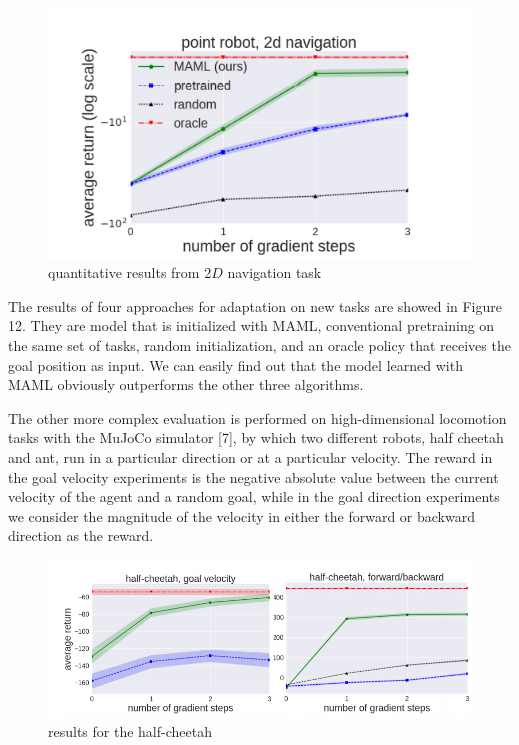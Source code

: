 \begin{figure}[H]
	\includegraphics[scale=0.8]{MAML_04.PNG}
	\centering
	\caption{ quantitative results from 2$D$ navigation task}
	\label{MAML}
\end{figure}

The results of four approaches for adaptation on new tasks are showed in Figure 12. They are model that is initialized with MAML, conventional pretraining on the same set of tasks, random initialization, and an oracle policy that receives the goal position as input. We can easily find out that the model learned with MAML obviously outperforms the other three algorithms.

The other more complex evaluation is performed on high-dimensional locomotion tasks with the MuJoCo simulator [7], by which two different robots, half  cheetah and ant, run in a particular direction or at a particular velocity. The reward in the goal velocity experiments is the negative absolute value between the current velocity of
the agent and a random goal, while in the goal direction experiments we consider the magnitude of the velocity in either the forward or backward direction as the reward.

\begin{figure}[H]
	\includegraphics[scale=0.5]{MAML_05.PNG}
	\centering
	\caption{results for the half-cheetah}
	\label{MAML}
\end{figure}

